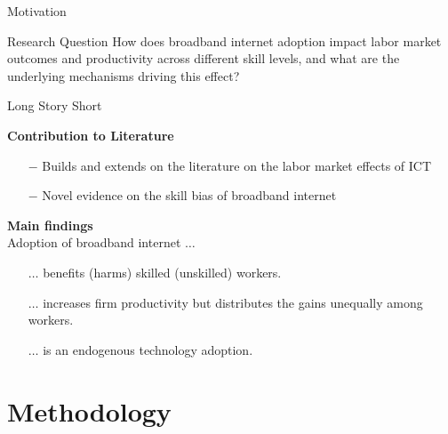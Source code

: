 \documentclass[compress, aspectratio=169, xcolor=dvipsnames]{beamer}
\begin{document}
\begin{frame}{Motivation}
\begin{block}{Research Question}
	How does broadband internet adoption impact labor market outcomes and productivity across different skill levels, and what are the underlying mechanisms driving this effect?
\end{block}
	
\end{frame}

\begin{frame}{Long Story Short}

\textbf{Contribution to Literature} 
\begin{itemize}
	\item[$-$] Builds and extends on the literature on the labor market effects of ICT
	\item[$-$] Novel evidence on the skill bias of broadband internet
\end{itemize}

\vspace{10pt}
\textbf{Main findings} \\
\vspace{3pt}
Adoption of broadband internet $\dots$
\begin{itemize}
	\item[$\dots$] benefits (harms) skilled (unskilled) workers.
	\item[$\dots$] increases firm productivity but distributes the gains unequally among workers.
	\item[$\dots$] is an endogenous technology adoption.
\end{itemize}
	
\end{frame}


\section{Methodology}
\end{document}
